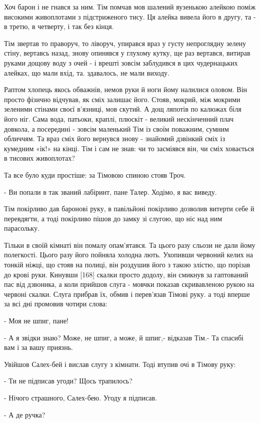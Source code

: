 Хоч барон і не гнався за ним. Тім помчав мов шалений вузенькою алейкою поміж високими живоплотами з підстриженого тису. Ця алейка вивела його в другу, та - в третю, в четверту, і так без кінця.

Тім звертав то праворуч, то ліворуч, упирався враз у густу непроглядну зелену стіну, вертавсь назад, знову опинявся у глухому кутку, ще раз вертався, витирав руками дощову воду з очей - і врешті зовсім заблудився в цих чудернацьких алейках, що мали вхід, та. здавалось, не мали виходу.

Раптом хлопець якось обважнів, немов руки й ноги йому налилися оловом. Він просто фізично відчував, як сміх залишає його. Стояв, мокрий, між мокрими зеленими стінами своєї в'язниці, мов скутий. А дощ ляпотів по калюжах біля його ніг. Сама вода, патьоки, краплі, плюскіт - великий нескінченний плач довкола, а посередині - зовсім маленький Тім із своїм поважним, сумним обличчям. Та враз сміх його вернувся знову - знайомий дзвінкий сміх із кумедним «ік!» на кінці. Тім і сам не знав: чи то засміявся він, чи сміх ховається в тисових живоплотах?

Та все було куди простіше: за Тімовою спиною стояв Троч.

- Ви попали в так званий лабіринт, пане Талер. Ходімо, я вас виведу.

Тім покірливо дав баронові руку, в павільйоні покірливо дозволив витерти себе й перевдягти, а тоді покірливо пішов до замку зі слугою, що ніс над ним парасольку.

Тільки в своїй кімнаті він помалу опам'ятався. Та цього разу сльози не дали йому полегкості. Цього разу його пойняла холодна лють. Ухопивши червоний келих на тонкій ніжці, що стояв на полиці, він роздушив його з такою злістю, що порізав до крові руки. Кинувши [168] скалки просто додолу, він смикнув за гаптований пас від дзвоника, а коли прийшов слуга - мовчки показав скривавленою рукою на червоні скалки. Слуга прибрав їх, обмив і перев'язав Тімові руку. а тоді вперше за всі дні промовив чотири слова:

- Моя не шпиг, пане!

- А я звідки знаю? Може, не шпиг, а може, й шпиг,- відказав Тім.- Та спасибі вам і за вашу приязнь.

Увійшов Салех-бей і вислав слугу з кімнати. Тоді втупив очі в Тімову руку:

- Ти не підписав угоди? Щось трапилось?

- Нічого страшного, Салех-бею. Угоду я підписав.

- А де ручка?

